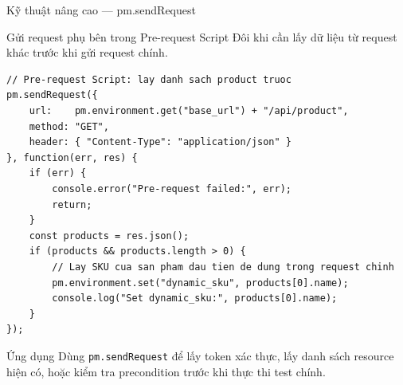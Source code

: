 \documentclass[aspectratio=169,10pt]{beamer}
\begin{document}
\begin{frame}[fragile]{Kỹ thuật nâng cao --- pm.sendRequest}
  \begin{block}{Gửi request phụ bên trong Pre-request Script}
    Đôi khi cần lấy dữ liệu từ request khác trước khi gửi request chính.
  \end{block}

\begin{lstlisting}[style=nonumber]
// Pre-request Script: lay danh sach product truoc
pm.sendRequest({
    url:    pm.environment.get("base_url") + "/api/product",
    method: "GET",
    header: { "Content-Type": "application/json" }
}, function(err, res) {
    if (err) {
        console.error("Pre-request failed:", err);
        return;
    }
    const products = res.json();
    if (products && products.length > 0) {
        // Lay SKU cua san pham dau tien de dung trong request chinh
        pm.environment.set("dynamic_sku", products[0].name);
        console.log("Set dynamic_sku:", products[0].name);
    }
});
\end{lstlisting}

  \begin{exampleblock}{Ứng dụng}
    Dùng \texttt{pm.sendRequest} để lấy token xác thực,
    lấy danh sách resource hiện có, hoặc kiểm tra precondition
    trước khi thực thi test chính.
  \end{exampleblock}
\end{frame}
\end{document}
